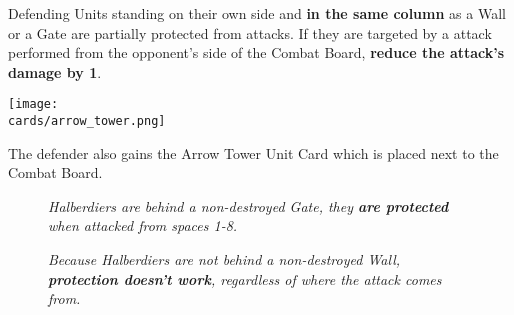 \begin{multicols}{2}
Defending Units standing on their own side and \textbf{in the same column} as a Wall or a Gate are partially protected from  attacks.
If they are targeted by a  attack performed from the opponent's side of the Combat Board, \textbf{reduce the attack's damage by 1}.

\begin{center}
  \texttt{[image: \\cards/arrow\_tower.png]}
\end{center}
The defender also gains the Arrow Tower Unit Card which is placed next to the Combat Board.

\end{multicols}

\vspace*{\fill}
\begin{figure*}[!hb]
  \mbox{}%
  \hfill%
  \begin{minipage}[t]{0.4\textwidth}
    \centering
  \caption[halberdiers protected]{\textit{Halberdiers are behind a non-destroyed Gate, they \textbf{are protected} when attacked from spaces 1-8.}}
  \end{minipage}
  \hfill%
  \begin{minipage}[t]{0.4\textwidth}
    \centering
  \caption[halberdiers unprotected]{\textit{Because Halberdiers are not behind a non-destroyed Wall, \textbf{protection doesn't work}, regardless of where the  attack comes from.}}
  \end{minipage}
  \hfill%
  \mbox{}%
\end{figure*}

